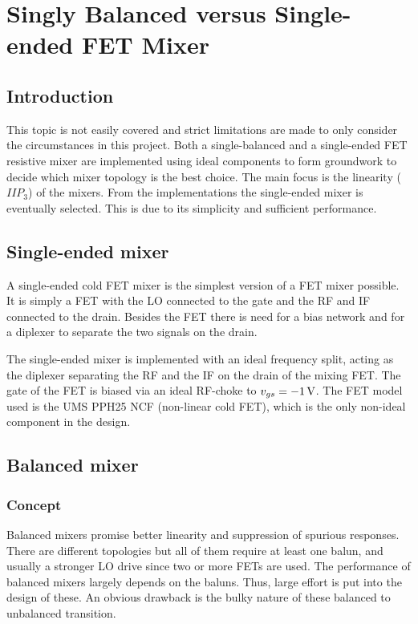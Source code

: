 \chapter{Singly Balanced versus Single-ended FET Mixer}\label{sec:endvsbal}
	\section{Introduction}
		This topic is not easily covered and strict limitations are made to only consider the circumstances in this project. Both a single-balanced and a single-ended FET resistive mixer are implemented using ideal components to form groundwork to decide which mixer topology is the best choice. The main focus is the linearity ($IIP_3$) of the mixers. From the implementations the single-ended mixer is eventually selected. This is due to its simplicity and sufficient performance.
		
	\section{Single-ended mixer}
		A single-ended cold FET mixer is the simplest version of a FET mixer possible. It is simply a FET with the LO connected to the gate and the RF and IF connected to the drain. Besides the FET there is need for a bias network and for a diplexer to separate the two signals on the drain.
		
		The single-ended mixer is implemented with an ideal frequency split, acting as the diplexer separating the RF and the IF on the drain of the mixing FET. The gate of the FET is biased via an ideal RF-choke to $v_{gs}=\unit[-1]{V}$. The FET model used is the UMS PPH25 NCF (non-linear cold FET), which is the only non-ideal component in the design.
			
	\section{Balanced mixer}
		\subsection{Concept}
			Balanced mixers promise better linearity and suppression of spurious responses. There are different topologies but all of them require at least one balun, and usually a stronger LO drive since two or more FETs are used. The performance of balanced mixers largely depends on the baluns. Thus, large effort is put into the design of these. An obvious drawback is the bulky nature of these balanced to unbalanced transition.
			
